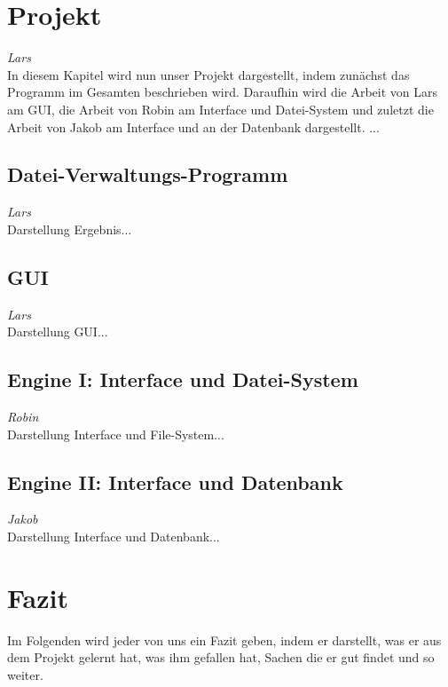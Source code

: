 \documentclass[12pt,a4paper,bibliography=totocnumbered,listof=totocnumbered]{scrartcl}
\begin{document}
\pagebreak

\section{Projekt}
\label{sec:Projekt}
\emph{Lars}\\
In diesem Kapitel wird nun unser Projekt dargestellt, indem zunächst das Programm im Gesamten beschrieben wird. Daraufhin wird die Arbeit von Lars am GUI, die Arbeit von Robin am Interface und Datei-System und zuletzt die Arbeit von Jakob am Interface und an der Datenbank dargestellt. 
...

\subsection{Datei-Verwaltungs-Programm}
\emph{Lars}\\
Darstellung Ergebnis...

\subsection{GUI}
\emph{Lars}\\
Darstellung GUI...

\subsection{Engine I: Interface und Datei-System}
\emph{Robin}\\
Darstellung Interface und File-System...

\subsection{Engine II: Interface und Datenbank}
\emph{Jakob}\\
Darstellung Interface und Datenbank...
\pagebreak
\section{Fazit}
\label{sec:Fazit}
Im Folgenden wird jeder von uns ein Fazit geben, indem er darstellt, was er aus dem Projekt gelernt hat, was ihm gefallen hat, Sachen die er gut findet und so weiter.
\end{document}
